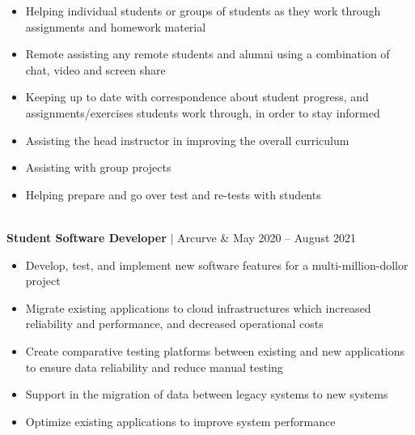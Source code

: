\documentclass[11pt]{article}
\newenvironment{compactList}
{
  \begin{itemize}
    \setlength{\itemsep}{0pt}
    \setlength{\parskip}{0pt}
}
{\end{itemize}}
\begin{document}
\begin{tabularx}{\textwidth\setlength{\extrarowheight}{5pt}}
  {
    \begin{minipage}{0.85\paperwidth}
      \begin{compactList}
        \item Helping individual students or groups of students as they work through assignments and homework material
        \item Remote assisting any remote students and alumni using a combination of chat, video and screen share
        \item Keeping up to date with correspondence about student progress, and assignments/exercises students work through, in order to stay informed
        \item Assisting the head instructor in improving the overall curriculum
        \item Assisting with group projects
        \item Helping prepare and go over test and re-tests with students
      \end{compactList}
    \end{minipage}
  }
  \\
  \textbf{Student Software Developer} $\vert$ Arcurve                     & May 2020 – August 2021 \\
  {
    \begin{minipage}{0.85\paperwidth}
      \begin{compactList}
        \item Develop, test, and implement new software features for a multi-million-dollor project
        \item Migrate existing applications to cloud infrastructures which increased reliability and performance, and decreased operational costs
        \item Create comparative testing platforms between existing and new applications to ensure data reliability and reduce manual testing
        \item Support in the migration of data between legacy systems to new systems
        \item Optimize existing applications to improve system performance
      \end{compactList}
    \end{minipage}
  }
\end{tabularx}
\vspace{-10pt}
\end{document}
